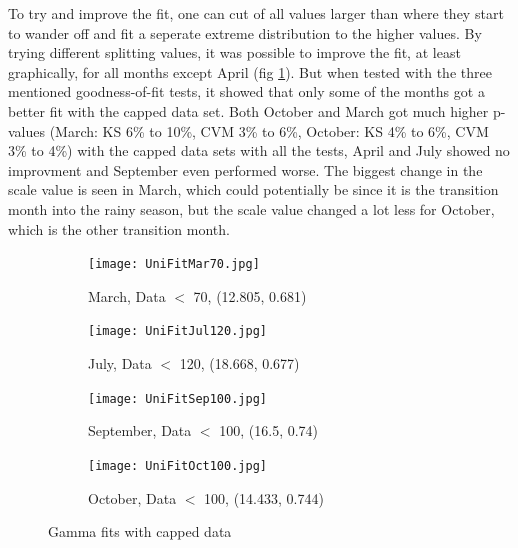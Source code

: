 \documentclass{article}
\begin{document}
	To try and improve the fit, one can cut of all values larger than where they start to wander off and fit a seperate extreme distribution to the higher values. By trying different splitting values, it was possible to improve the fit, at least graphically, for all months except April (fig \ref{UniCap}). But when tested with the three mentioned goodness-of-fit tests, it showed that only some of the months got a better fit with the capped data set. Both October and March got much higher p-values (March: KS 6\% to 10\%, CVM 3\% to 6\%, October: KS 4\% to 6\%, CVM 3\% to 4\%) with the capped data sets with all the tests, April and July showed no improvment and September even performed worse. The biggest change in the scale value is seen in March, which could potentially be since it is the transition month into the rainy season, but the scale value changed a lot less for October, which is the other transition month. 
	\begin{figure}[H]
		\centering
		\begin{subfigure}{0.4\textwidth}
			\centering
			\texttt{[image: UniFitMar70.jpg]}
			\caption{March, Data $<$ 70, (12.805, 0.681)}
		\end{subfigure}%
		\begin{subfigure}{0.4\textwidth}
			\centering
			\texttt{[image: UniFitJul120.jpg]}
			\caption{July, Data $<$ 120, (18.668, 0.677)}
		\end{subfigure}
			\begin{subfigure}{0.4\textwidth}
			\centering
			\texttt{[image: UniFitSep100.jpg]}
			\caption{September, Data $<$ 100, (16.5, 0.74)}
		\end{subfigure}%
			\begin{subfigure}{0.4\textwidth}
			\centering
			\texttt{[image: UniFitOct100.jpg]}
			\caption{October, Data $<$ 100, (14.433, 0.744)}
		\end{subfigure}
		\caption{Gamma fits with capped data}
		\label{UniCap}
	\end{figure}	
\end{document}
